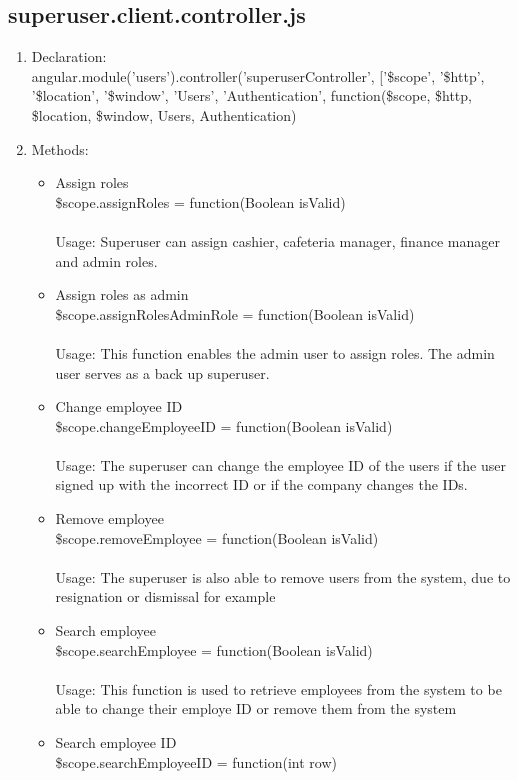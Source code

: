 \documentclass[a4paper,12pt]{report}
\begin{document}
\subsection{superuser.client.controller.js}
\begin{enumerate}
\item Declaration: \\ angular.module('users').controller('superuserController', ['\$scope', '\$http', '\$location', '\$window', 'Users', 'Authentication',
	function(\$scope, \$http, \$location, \$window, Users, Authentication)  
\item Methods: 
	\begin{itemize}
		\item Assign roles \\ \$scope.assignRoles = function(Boolean isValid)   \\ \\
		Usage: Superuser can assign cashier, cafeteria manager, finance manager and admin roles.
		\item Assign roles as admin \\ \$scope.assignRolesAdminRole = function(Boolean isValid) \\ \\
		Usage: This function enables the admin user to assign roles. The admin user serves as a back up superuser.
		\item Change employee ID \\ \$scope.changeEmployeeID = function(Boolean isValid)\\ \\
		Usage: The superuser can change the employee ID of the users if the user signed up with the incorrect ID or if the company changes the IDs.
		\item Remove employee \\ \$scope.removeEmployee = function(Boolean isValid)  
		\\ \\ Usage: The superuser is also able to remove users from the system, due to resignation or dismissal for example
		\item Search employee \\ \$scope.searchEmployee = function(Boolean isValid)  
		\\ \\ Usage: This function is used to retrieve employees from the system to be able to change their employe ID or remove them from the system
		\item Search employee ID \\ \$scope.searchEmployeeID = function(int row)  

\end{itemize}
\end{enumerate}
\end{document}

